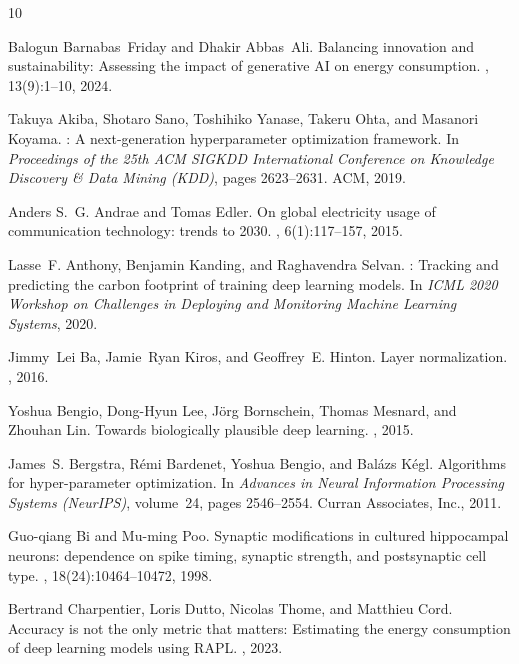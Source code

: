 \documentclass[11pt, english]{article}
\begin{document}
\begin{thebibliography}{10}

Balogun Barnabas~Friday and Dhakir Abbas~Ali.
\newblock Balancing innovation and sustainability: Assessing the impact of
  generative {AI} on energy consumption.
,
  13(9):1--10, 2024.

Takuya Akiba, Shotaro Sano, Toshihiko Yanase, Takeru Ohta, and Masanori Koyama.
: A next-generation hyperparameter optimization framework.
\newblock In {\em Proceedings of the 25th {ACM SIGKDD} International
  Conference on Knowledge Discovery \& Data Mining (KDD)}, pages 2623--2631.
  ACM, 2019.

Anders S.~G. Andrae and Tomas Edler.
\newblock On global electricity usage of communication technology: trends to
  2030.
, 6(1):117--157, 2015.

Lasse~F. Anthony, Benjamin Kanding, and Raghavendra Selvan.
: Tracking and predicting the carbon footprint of
  training deep learning models.
\newblock In {\em {ICML} 2020 Workshop on Challenges in Deploying and
  Monitoring Machine Learning Systems}, 2020.

Jimmy~Lei Ba, Jamie~Ryan Kiros, and Geoffrey~E. Hinton.
\newblock Layer normalization.
, 2016.

Yoshua Bengio, Dong-Hyun Lee, J{\"o}rg Bornschein, Thomas Mesnard, and Zhouhan
  Lin.
\newblock Towards biologically plausible deep learning.
, 2015.

James~S. Bergstra, R{\'e}mi Bardenet, Yoshua Bengio, and Bal{\'a}zs K{\'e}gl.
\newblock Algorithms for hyper-parameter optimization.
\newblock In {\em Advances in Neural Information Processing Systems (NeurIPS)},
  volume~24, pages 2546--2554. Curran Associates, Inc., 2011.

Guo-qiang Bi and Mu-ming Poo.
\newblock Synaptic modifications in cultured hippocampal neurons: dependence on
  spike timing, synaptic strength, and postsynaptic cell type.
, 18(24):10464--10472, 1998.

Bertrand Charpentier, Loris Dutto, Nicolas Thome, and Matthieu Cord.
\newblock Accuracy is not the only metric that matters: Estimating the energy
  consumption of deep learning models using {RAPL}.
, 2023.


\end{thebibliography}
\end{document}
